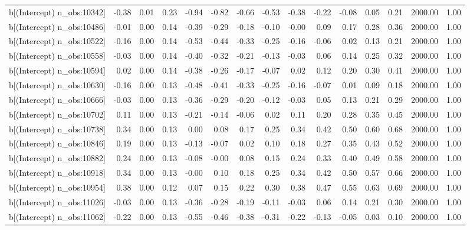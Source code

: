 \begin{table}[ht]
\begin{tabular}{rrrrrrrrrrrrrrr}
  b[(Intercept) n\_obs:10342] & -0.38 & 0.01 & 0.23 & -0.94 & -0.82 & -0.66 & -0.53 & -0.38 & -0.22 & -0.08 & 0.05 & 0.21 & 2000.00 & 1.00 \\ 
  b[(Intercept) n\_obs:10486] & -0.01 & 0.00 & 0.14 & -0.39 & -0.29 & -0.18 & -0.10 & -0.00 & 0.09 & 0.17 & 0.28 & 0.36 & 2000.00 & 1.00 \\ 
  b[(Intercept) n\_obs:10522] & -0.16 & 0.00 & 0.14 & -0.53 & -0.44 & -0.33 & -0.25 & -0.16 & -0.06 & 0.02 & 0.13 & 0.21 & 2000.00 & 1.00 \\ 
  b[(Intercept) n\_obs:10558] & -0.03 & 0.00 & 0.14 & -0.40 & -0.32 & -0.21 & -0.13 & -0.03 & 0.06 & 0.14 & 0.25 & 0.32 & 2000.00 & 1.00 \\ 
  b[(Intercept) n\_obs:10594] & 0.02 & 0.00 & 0.14 & -0.38 & -0.26 & -0.17 & -0.07 & 0.02 & 0.12 & 0.20 & 0.30 & 0.41 & 2000.00 & 1.00 \\ 
  b[(Intercept) n\_obs:10630] & -0.16 & 0.00 & 0.13 & -0.48 & -0.41 & -0.33 & -0.25 & -0.16 & -0.07 & 0.01 & 0.09 & 0.18 & 2000.00 & 1.00 \\ 
  b[(Intercept) n\_obs:10666] & -0.03 & 0.00 & 0.13 & -0.36 & -0.29 & -0.20 & -0.12 & -0.03 & 0.05 & 0.13 & 0.21 & 0.29 & 2000.00 & 1.00 \\ 
  b[(Intercept) n\_obs:10702] & 0.11 & 0.00 & 0.13 & -0.21 & -0.14 & -0.06 & 0.02 & 0.11 & 0.20 & 0.28 & 0.35 & 0.45 & 2000.00 & 1.00 \\ 
  b[(Intercept) n\_obs:10738] & 0.34 & 0.00 & 0.13 & 0.00 & 0.08 & 0.17 & 0.25 & 0.34 & 0.42 & 0.50 & 0.60 & 0.68 & 2000.00 & 1.00 \\ 
  b[(Intercept) n\_obs:10846] & 0.19 & 0.00 & 0.13 & -0.13 & -0.07 & 0.02 & 0.10 & 0.18 & 0.27 & 0.35 & 0.43 & 0.52 & 2000.00 & 1.00 \\ 
  b[(Intercept) n\_obs:10882] & 0.24 & 0.00 & 0.13 & -0.08 & -0.00 & 0.08 & 0.15 & 0.24 & 0.33 & 0.40 & 0.49 & 0.58 & 2000.00 & 1.00 \\ 
  b[(Intercept) n\_obs:10918] & 0.34 & 0.00 & 0.13 & -0.00 & 0.10 & 0.18 & 0.25 & 0.34 & 0.42 & 0.50 & 0.57 & 0.66 & 2000.00 & 1.00 \\ 
  b[(Intercept) n\_obs:10954] & 0.38 & 0.00 & 0.12 & 0.07 & 0.15 & 0.22 & 0.30 & 0.38 & 0.47 & 0.55 & 0.63 & 0.69 & 2000.00 & 1.00 \\ 
  b[(Intercept) n\_obs:11026] & -0.03 & 0.00 & 0.13 & -0.36 & -0.28 & -0.19 & -0.11 & -0.03 & 0.06 & 0.14 & 0.21 & 0.30 & 2000.00 & 1.00 \\ 
  b[(Intercept) n\_obs:11062] & -0.22 & 0.00 & 0.13 & -0.55 & -0.46 & -0.38 & -0.31 & -0.22 & -0.13 & -0.05 & 0.03 & 0.10 & 2000.00 & 1.00 \\ 

\end{tabular}
\end{table}
